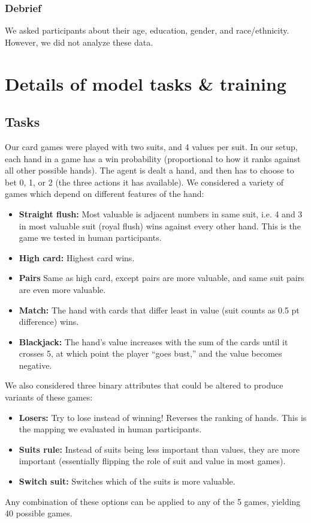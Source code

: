 \subsubsection{Debrief}
We asked participants about their age, education, gender, and race/ethnicity. However, we did not analyze these data.


\section{Details of model tasks \& training}\label{app:human:model_details}
\subsection{Tasks}

Our card games were played with two suits, and 4 values per suit. In our setup, each hand in a game has a win probability (proportional to how it ranks against all other possible hands). The agent is dealt a hand, and then has to choose to bet 0, 1, or 2 (the three actions it has available). We considered a variety of games which depend on different features of the hand:
\begin{itemize}
\item \textbf{Straight flush:} Most valuable is adjacent numbers in same suit, i.e. 4 and 3 in most valuable suit (royal flush) wins against every other hand. This is the game we tested in human participants.
\item \textbf{High card:} Highest card wins.
\item \textbf{Pairs} Same as high card, except pairs are more valuable, and same suit pairs are even more valuable.
\item \textbf{Match:} The hand with cards that differ least in value (suit counts as 0.5 pt difference) wins.
\item \textbf{Blackjack:} The hand's value increases with the sum of the cards until it crosses 5, at which point the player ``goes bust,'' and the value becomes negative.
\end{itemize}
We also considered three binary attributes that could be altered to produce variants of these games:
\begin{itemize}
\item \textbf{Losers:} Try to lose instead of winning! Reverses the ranking of hands. This is the mapping we evaluated in human participants.
\item \textbf{Suits rule:} Instead of suits being less important than values, they are more important (essentially flipping the role of suit and value in most games).
\item \textbf{Switch suit:} Switches which of the suits is more valuable.
\end{itemize}
Any combination of these options can be applied to any of the 5 games, yielding 40 possible games. \par

